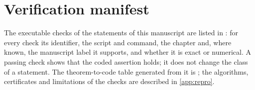 \chapter{Verification manifest}
\label{app:manifest}

The executable checks of the statements of this manuscript are listed in : for every check its
identifier, the script and command, the chapter and, where known, the manuscript label it supports, and whether it is exact or numerical.
A passing check shows that the coded assertion holds; it does not change the class of a statement. The theorem-to-code table generated from it is
; the algorithms, certificates and limitations of the checks are described in \cref{app:repro}.
